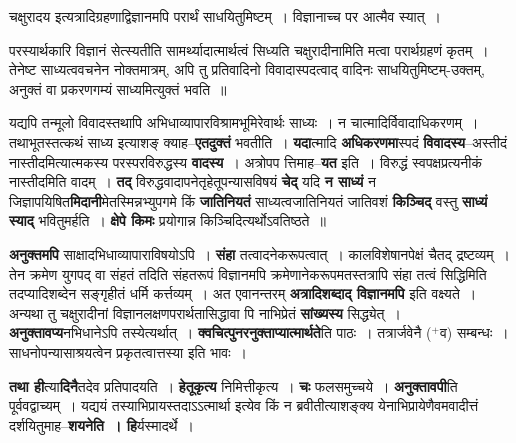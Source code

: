 \documentclass[article,12pt,a4paper]{memoir}
\newcommand{\add}[1]{($^{+}$#1)}
\begin{document}
	  \pstart चक्षुरादय इत्यत्रादिग्रहणाद्विज्ञानमपि परार्थं साधयितुमिष्टम् । विज्ञानाच्च पर आत्मैव स्यात् ।
	\pend
        

	  \pstart {}परस्यार्थकारि विज्ञानं सेत्स्यतीति सामर्थ्यादात्मार्थत्वं सिध्यति चक्षुरादीनामिति मत्वा परार्थग्रहणं कृतम् । तेनेष्ट साध्यत्ववचनेन नोक्तमात्रम्, अपि तु प्रतिवादिनो विवादास्पदत्वाद् वादिनः साधयितुमिष्टम्-उक्तम्, अनुक्तं वा प्रकरणगम्यं साध्यमित्युक्तं भवति ॥
	\pend
      
	  \endgroup
	

	  \pstart यद्यपि तन्मूलो विवादस्तथापि अभिधाव्यापारविश्रामभूमिरेवार्थः साध्यः । न चात्मादिर्विवादाधिकरणम् । तथाभूतस्तत्कथं साध्य इत्याशङ् क्याह--\textbf{एतदुक्तं} भवतीति । \textbf{यदा}त्मादि \textbf{अधिकरणमा}स्पदं \textbf{विवादस्य}--अस्तीदं नास्तीदमित्यात्मकस्य परस्परविरुद्धस्य \textbf{वादस्य} । अत्रोपप\leavevmode{} त्तिमाह--\textbf{यत} इति । विरुद्धं स्वपक्षप्रत्यनीकं नास्तीदमिति वादम् । \textbf{तद्} विरुद्धवादापनेतृहेतूपन्यासविषयं \textbf{चेद्} यदि \textbf{न साध्यं} न जिज्ञापयिषित\textbf{मिदानी}मेतस्मिन्नभ्युपगमे किं \textbf{जातिनियतं} साध्यत्वजातिनियतं जातिवशं \textbf{किञ्चिद्} वस्तु \textbf{साध्यं स्याद्} भवितुमर्हति । \textbf{क्षेपे किमः} प्रयोगान्न किञ्चिदित्यर्थोऽवतिष्ठते ॥
	\pend
      

	  \pstart \textbf{अनुक्तमपि} साक्षादभिधाव्यापाराविषयोऽपि । \textbf{संहा } तत्वादनेकरूपत्वात् । कालविशेषानपेक्षं चैतद् द्रष्टव्यम् । तेन क्रमेण युगपद् वा संहतं तदिति संहतरूपं विज्ञानमपि क्रमेणानेकरूपमतस्तत्रापि संहा  तत्वं सिद्धिमिति तदप्यादिशब्देन सङ्गृहीतं धर्मि कर्त्तव्यम् । अत एवानन्तरम् \textbf{अत्रादिशब्दाद् विज्ञानमपि} इति वक्ष्यते । अन्यथा तु चक्षुरादीनां विज्ञानलक्षणपरार्थतासिद्धावा  पि नाभिप्रेतं \textbf{सांख्यस्य} सिद्ध्येत् । \textbf{अनुक्तावप्य}नभिधानेऽपि तस्येत्यर्थात् । \textbf{क्वचित्पुनरनुक्ताप्यात्मार्थते}ति पाठः । तत्रार्जवेनै \add{व} सम्बन्धः । साधनोपन्यासाश्रयत्वेन प्रकृतत्वात्तस्या इति भावः ।
	\pend
      

	  \pstart \textbf{तथा ही}त्या\textbf{दिनै}तदेव प्रतिपादयति । \textbf{हेतूकृत्य} निमित्तीकृत्य । \textbf{चः} फलसमुच्चये । \textbf{अनुक्तावपी}ति पूर्ववद्वाच्यम् । यद्ययं तस्याभिप्रायस्तदाऽऽत्मार्था इत्येव किं न ब्रवीतीत्याशङ्क्य येनाभिप्रायेणैवमवादीत्तं दर्शयितुमाह--\textbf{शयनेति । हि}र्यस्मादर्थे ।
	\pend
	  \bigskip
	  \begingroup
	
\end{document}
